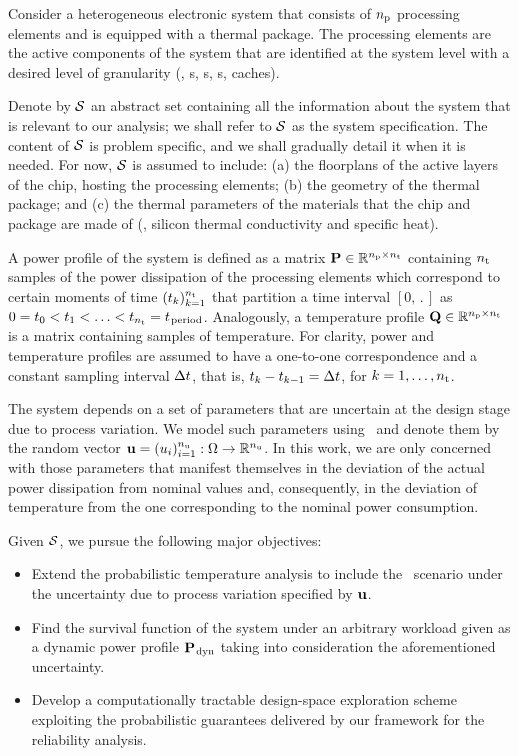Consider a heterogeneous electronic system that consists of ${n_\text{p}}$ processing elements and is equipped with a thermal package.
The processing elements are the active components of the system that are identified at the system level with a desired level of granularity (\eg, s, s, s, caches).

Denote by $\mathcal{S}$ an abstract set containing all the information about the system that is relevant to our analysis; we shall refer to $\mathcal{S}$ as the system specification.
The content of $\mathcal{S}$ is problem specific, and we shall gradually detail it when it is needed.
For now, $\mathcal{S}$ is assumed to include: (a) the floorplans of the active layers of the chip, hosting the processing elements; (b) the geometry of the thermal package; and (c) the thermal parameters of the materials that the chip and package are made of (\eg, silicon thermal conductivity and specific heat).

A power profile of the system is defined as a matrix $\mathbf{P} \in \mathbb{R}^{{n_\text{p}} \times {n_\text{t}}}$ containing ${n_\text{t}}$ samples of the power dissipation of the processing elements which correspond to certain moments of time $(t_k)_{k = 1}^{n_\text{t}}$ that partition a time interval $[0, \period]$ as $0 = t_0 < t_1 < \dotsc < t_{n_\text{t}} = t_{\text{\kern0.1emperiod}}$.
Analogously, a temperature profile $\mathbf{Q} \in \mathbb{R}^{{n_\text{p}} \times {n_\text{t}}}$ is a matrix containing samples of temperature.
For clarity, power and temperature profiles are assumed to have a one-to-one correspondence and a constant sampling interval $\Delta t$, that is, $t_k - t_{k - 1} = \Delta t$, for $k = 1, \dots, {n_\text{t}}$.

The system depends on a set of parameters that are uncertain at the design stage due to process variation.
We model such parameters using \rvs\ and denote them by the random vector $\mathbf{u} = (u_i)_{i = 1}^{n_\text{u}}: \Omega \to \mathbb{R}^{n_\text{u}}$.
In this work, we are only concerned with those parameters that manifest themselves in the deviation of the actual power dissipation from nominal values and, consequently, in the deviation of temperature from the one corresponding to the nominal power consumption.

Given $\mathcal{S}$, we pursue the following major objectives:
\begin{itemize}
  \item Extend the probabilistic temperature analysis to include the \DSS\ scenario under the uncertainty due to process variation specified by $\mathbf{u}$.
  \item Find the survival function of the system under an arbitrary workload given as a dynamic power profile $\mathbf{P}_{\text{\kern0.1emdyn}}$ taking into consideration the aforementioned uncertainty.
  \item Develop a computationally tractable design-space exploration scheme exploiting the probabilistic guarantees delivered by our framework for the reliability analysis.
\end{itemize}

